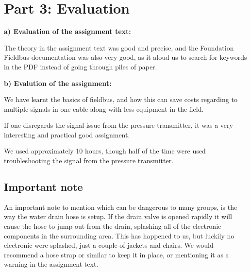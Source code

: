 \newpage
\section{Part 3: Evaluation}

\textbf{a) Evaluation of the assignment text:}

The theory in the assignment text was good and precise, and the Foundation Fieldbus documentation was also very good, as it aloud us to search for keywords in the PDF instead of going through piles of paper.

\textbf{b) Evalution of the assignment:}

We have learnt the basics of fieldbus, and how this can save costs regarding to multiple signals in one cable along with less equipment in the field.

If one disregards the signal-issue from the pressure transmitter, it was a very interesting and practical good assignment.


We used approximately 10 hours, though half of the time were used troubleshooting the signal from the pressure transmitter.

\subsection{Important note}
An important note to mention which can be dangerous to many groups, is the way the water drain hose is setup. If the drain valve is opened rapidly it will cause the hose to jump out from the drain, splashing all of the electronic components in the surrounding area. This has happened to us, but luckily no electronic were splashed, just a couple of jackets and chairs. We would recommend a hose strap or similar to keep it in place, or mentioning it as a warning in the assignment text.